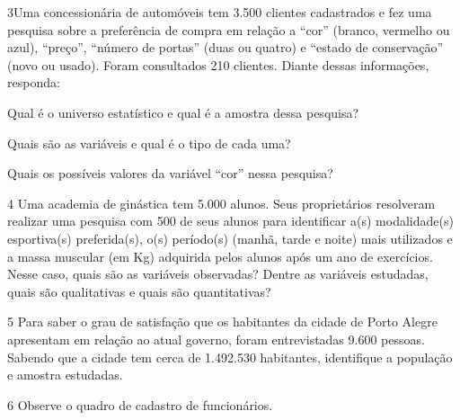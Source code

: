 \num{3}Uma concessionária de automóveis tem 3.500 clientes cadastrados e
fez uma pesquisa sobre a preferência de compra em relação a “cor”
(branco, vermelho ou azul), “preço”, “número de portas” (duas ou
quatro) e “estado de conservação” (novo ou usado). Foram consultados
210 clientes. Diante dessas informações, responda:

\begin{escolha}
\item
  Qual é o universo estatístico e qual é a amostra dessa pesquisa?
\item{}

\item
  Quais são as variáveis e qual é o tipo de cada uma?
\item{}

\item
  Quais os possíveis valores da variável “cor” nessa pesquisa?
\item{}
\end{escolha}

\num{4} Uma academia de ginástica tem 5.000 alunos. Seus proprietários
resolveram realizar uma pesquisa com 500 de seus alunos para identificar
a(s) modalidade(s) esportiva(s) preferida(s), o(s) período(s) (manhã,
tarde e noite) mais utilizados e a massa muscular (em Kg) adquirida
pelos alunos após um ano de exercícios. Nesse caso, quais são as
variáveis observadas? Dentre as variáveis estudadas, quais são
qualitativas e quais são quantitativas?


\num{5} Para saber o grau de satisfação que os habitantes da cidade
de Porto Alegre apresentam em relação ao atual governo, foram
entrevistadas 9.600 pessoas. Sabendo que a cidade tem cerca de 1.492.530
habitantes, identifique a população e amostra estudadas.



\pagebreak
\num{6} Observe o quadro de cadastro de
funcionários.

